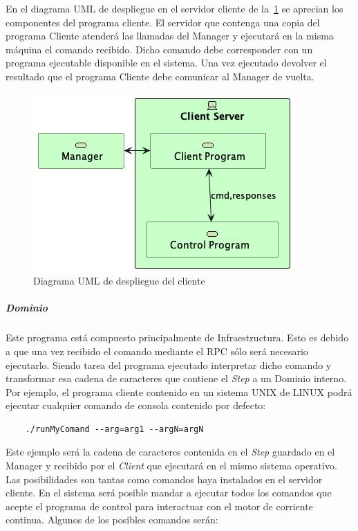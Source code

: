 
En el diagrama UML de despliegue en el servidor cliente de la~\cref{fig:Diagrama UML de despliegue del cliente} se aprecian los componentes del programa cliente.
El servidor que contenga una copia del programa Cliente atenderá las llamadas del Manager y ejecutará en la misma máquina el comando recibido.
Dicho comando debe corresponder con un programa ejecutable disponible en el sistema.
Una vez ejecutado devolver el resultado que el programa Cliente debe comunicar al Manager de vuelta.

\begin{figure}[H]
    \centering
    \includegraphics[height=0.2\textheight]{./part/Proyecto_ejecutivo/memoria_descriptiva/descripcionDelProyecto/client/uml/clientServerConcept}
    \caption{Diagrama UML de despliegue del cliente}\label{fig:Diagrama UML de despliegue del cliente}
\end{figure}

\subparagraph{Dominio}

Este programa está compuesto principalmente de Infraestructura.
Esto es debido a que una vez recibido el comando mediante el RPC sólo será necesario ejecutarlo.
Siendo tarea del programa ejecutado interpretar dicho comando y transformar esa cadena de caracteres que contiene el \textit{Step} a un Dominio interno.
Por ejemplo, el programa cliente contenido en un sistema UNIX de LINUX podrá ejecutar cualquier comando de consola contenido por defecto:

\begin{verbatim}
    ./runMyComand --arg=arg1 --argN=argN
\end{verbatim}

Este ejemplo será la cadena de caracteres contenida en el \textit{Step} guardado en el Manager y recibido por el \textit{Client} que ejecutará en el mismo sistema operativo.
Las posibilidades son tantas como comandos haya instalados en el servidor cliente.
En el sistema será posible mandar a ejecutar todos los comandos que acepte el programa de control para interactuar con el motor de corriente continua.
Algunos de los posibles comandos serán:

